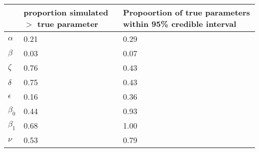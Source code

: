 \begin{table}[ht]
\centering
\begin{tabular}{lp{1.5in}p{1.5in}}
  \hline
 & proportion simulated $>$ true parameter & Propoortion of true parameters 
 within 95\% credible interval \\ 
  \hline
$\alpha$ & 0.21 & 0.29 \\ 
  $\beta$ & 0.03 & 0.07 \\ 
  $\zeta$ & 0.76 & 0.43 \\ 
  $\delta$ & 0.75 & 0.43 \\ 
  $\epsilon$ & 0.16 & 0.36 \\ 
  $\beta_0$ & 0.44 & 0.93 \\ 
  $\beta_1$ & 0.68 & 1.00 \\ 
  $\nu$ & 0.53 & 0.79 \\ 
   \hline
\end{tabular}
\end{table}
